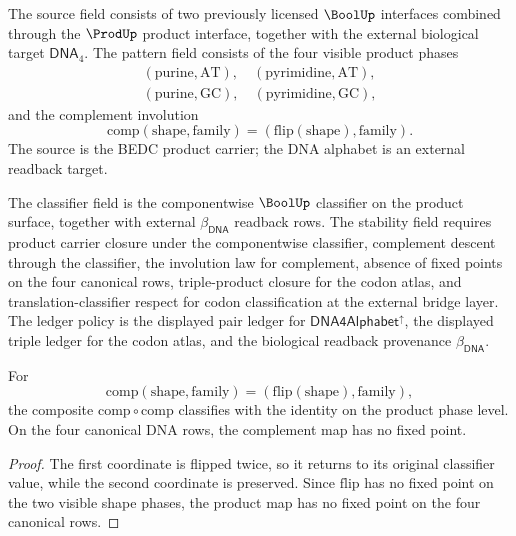 \begin{definition}
\label{def:philosophy-dna-source-pattern-fields}
The source field consists of two previously licensed $\BoolUp$
interfaces combined through the $\ProdUp$ product interface, together
with the external biological target $\mathsf{DNA}_{4}$. The pattern
field consists of the four visible product phases
$$
\begin{gathered}
  (\mathrm{purine},\mathrm{AT}),
  \quad
  (\mathrm{pyrimidine},\mathrm{AT}),\\
  (\mathrm{purine},\mathrm{GC}),
  \quad
  (\mathrm{pyrimidine},\mathrm{GC}),
\end{gathered}
$$
and the complement involution
$$
  \mathrm{comp}(\mathrm{shape},\mathrm{family})
  =
  (\mathrm{flip}(\mathrm{shape}),\mathrm{family}).
$$
The source is the BEDC product carrier; the DNA alphabet is an external
readback target.
\end{definition}

\begin{definition}
\label{def:philosophy-dna-classifier-stability-ledger-fields}
The classifier field is the componentwise $\BoolUp$ classifier on the
product surface, together with external $\beta_{\mathsf{DNA}}$ readback
rows. The stability field requires product carrier closure under the
componentwise classifier, complement descent through the classifier,
the involution law for complement, absence of fixed points on the four
canonical rows, triple-product closure for the codon atlas, and
translation-classifier respect for codon classification at the external
bridge layer. The ledger policy is the displayed pair ledger for
$\mathsf{DNA4Alphabet}^{\uparrow}$, the displayed triple ledger for the
codon atlas, and the biological readback provenance
$\beta_{\mathsf{DNA}}$.
\end{definition}

\begin{theorem}
\label{thm:philosophy-dna-complement-involution}
For
$$
  \mathrm{comp}(\mathrm{shape},\mathrm{family})
  =
  (\mathrm{flip}(\mathrm{shape}),\mathrm{family}),
$$
the composite $\mathrm{comp}\circ\mathrm{comp}$ classifies with the
identity on the product phase level. On the four canonical DNA rows, the
complement map has no fixed point.
\end{theorem}
\begin{proof}
The first coordinate is flipped twice, so it returns to its original
classifier value, while the second coordinate is preserved. Since
$\mathrm{flip}$ has no fixed point on the two visible shape phases, the
product map has no fixed point on the four canonical rows.
\end{proof}

